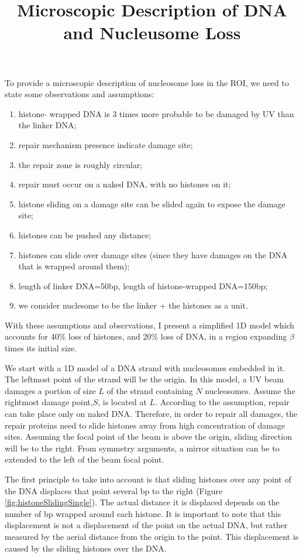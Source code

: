 \documentclass[12pt]{paper}
\begin{document}
\title{Microscopic Description of DNA and Nucleusome Loss}
\maketitle
  To provide a microscopic description of nucleosome loss in the ROI, we need to state some observations and assumptions:
  \begin{enumerate}
  	\itemsep0em
  	\item histone- wrapped DNA is 3 times more probable to be damaged by UV than the linker DNA;
  	\item repair mechanism presence indicate damage site;
  	\item the repair zone is roughly circular;  
  	\item repair must occur on a naked DNA, with no histones on it; 
  	\item histone sliding on a damage site can be slided again to expose the damage site;
  	\item histones can be pushed any distance;
  	\item histones can slide over damage sites (since they have damages on the DNA that is wrapped around them);
  	\item length of linker DNA=50bp, length of histone-wrapped DNA=150bp;
  	\item we consider nuclesome to be the linker + the histones as a unit.   
  \end{enumerate}
     With these assumptions and observations, I present a simplified 1D model which accounts for 40\% loss of histones, and 20\% loss of DNA, in a region expanding $\beta$ times its initial size. 
     
     We start with a 1D model of a DNA strand with nucleosomes embedded in it. The leftmost point of the strand will be the origin. In this model, a UV beam damages a portion of size $L$ of the strand containing $N$ nucleosomes. Assume the rightmost damage point,$S$, is located at $L$. According to the assumption, repair can take place only on naked DNA. Therefore, in order to repair all damages, the repair proteins need to slide histones away from high concentration of damage sites. Assuming the focal point of the beam is above the origin, sliding direction will be to the right. From symmetry arguments, a mirror situation can be to extended to the left of the beam focal point.     
     
     The first principle to take into account is that sliding histones over any point of the DNA displaces that point several bp to the right (Figure \ref{fig:histoneSlidingSingle}). The actual distance it is displaced depends on the number of bp wrapped around each histone. It is important to note that this displacement is not a displacement of the point on the actual DNA, but rather measured by the aerial distance from the origin to the point. This displacement is caused by the sliding histones over the DNA.
     
\end{document}
